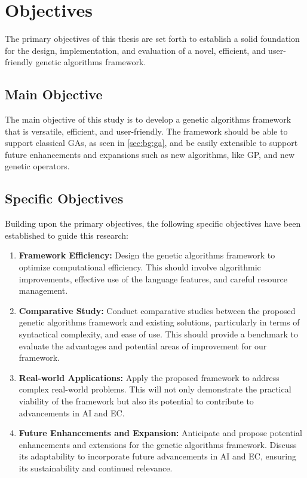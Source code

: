 \section{Objectives}
\label{sec:objectives}
  The primary objectives of this thesis are set forth to establish a solid foundation for the design, implementation, 
  and evaluation of a novel, efficient, and user-friendly genetic algorithms framework.

  \subsection{Main Objective}
    The main objective of this study is to develop a genetic algorithms framework that is versatile, efficient, and
    user-friendly. The framework should be able to support classical GAs, as seen in \vref{sec:bg:ga}, and be easily 
    extensible to support future enhancements and expansions such as new algorithms, like GP, and new genetic operators.

  \subsection{Specific Objectives}
    Building upon the primary objectives, the following specific objectives have been established to guide this 
    research:
    
    \begin{enumerate}
      \item \textbf{Framework Efficiency:} Design the genetic algorithms framework to optimize computational efficiency.
        This should involve algorithmic improvements, effective use of the language features, and careful resource 
        management.
      \item \textbf{Comparative Study:} Conduct comparative studies between the proposed genetic algorithms framework
        and existing solutions, particularly in terms of syntactical complexity, and ease of use.
        This should provide a benchmark to evaluate the advantages and potential areas of improvement for our framework.
      \item \textbf{Real-world Applications:} Apply the proposed framework to address complex real-world problems.
        This will not only demonstrate the practical viability of the framework but also its potential to contribute to
        advancements in AI and EC.
      \item \textbf{Future Enhancements and Expansion:} Anticipate and propose potential enhancements and extensions 
        for the genetic algorithms framework. Discuss its adaptability to incorporate future advancements in AI and 
        EC, ensuring its sustainability and continued relevance.
    \end{enumerate} 
    